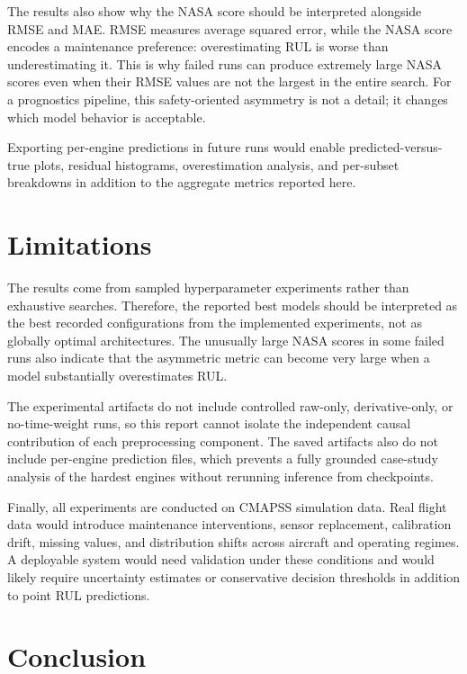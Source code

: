\documentclass[11pt,a4paper]{article}
\begin{document}
The results also show why the NASA score should be interpreted alongside RMSE and MAE. RMSE measures average squared error, while the NASA score encodes a maintenance preference: overestimating RUL is worse than underestimating it. This is why failed runs can produce extremely large NASA scores even when their RMSE values are not the largest in the entire search. For a prognostics pipeline, this safety-oriented asymmetry is not a detail; it changes which model behavior is acceptable.

Exporting per-engine predictions in future runs would enable predicted-versus-true plots, residual histograms, overestimation analysis, and per-subset breakdowns in addition to the aggregate metrics reported here.

\newpage

\section{Limitations}

The results come from sampled hyperparameter experiments rather than exhaustive searches. Therefore, the reported best models should be interpreted as the best recorded configurations from the implemented experiments, not as globally optimal architectures. The unusually large NASA scores in some failed runs also indicate that the asymmetric metric can become very large when a model substantially overestimates RUL.

The experimental artifacts do not include controlled raw-only, derivative-only, or no-time-weight runs, so this report cannot isolate the independent causal contribution of each preprocessing component. The saved artifacts also do not include per-engine prediction files, which prevents a fully grounded case-study analysis of the hardest engines without rerunning inference from checkpoints.

Finally, all experiments are conducted on CMAPSS simulation data. Real flight data would introduce maintenance interventions, sensor replacement, calibration drift, missing values, and distribution shifts across aircraft and operating regimes. A deployable system would need validation under these conditions and would likely require uncertainty estimates or conservative decision thresholds in addition to point RUL predictions.

\section{Conclusion}
\end{document}
